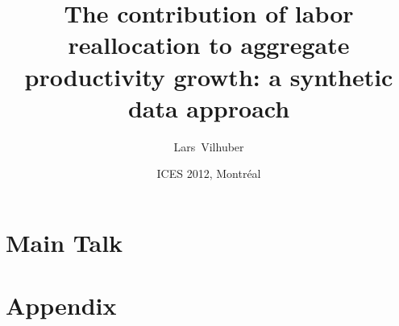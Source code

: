 \documentclass[xcolor=table,compress]{beamer}
\title[Synthetic reallocation]%
{The contribution of labor reallocation to aggregate productivity growth: a synthetic data approach}
\author[Vilhuber]{%
  Lars~Vilhuber\inst{1,2} }
\institute[Cornell]{
  \inst{1}%
  \texttt{[image: cu\_logo\_only]}
    Labor Dynamics Institute, 
   ILR, 
  Cornell University
  \and
  \inst{2}%
  Center for Economic Studies/LEHD, %
  U.S. Census Bureau
}
\date[ICES2012]{ICES 2012,  Montr\'eal}
\begin{document}
\frame{\titlepage}

%


\part<presentation>{Main Talk}

%
%


\ifpdf
{}
\fi

\part<presentation>{Appendix}


\ifpdf
{}
\fi
\end{document}
